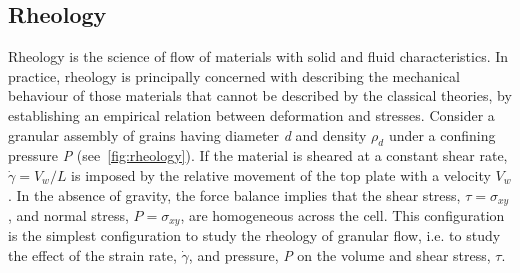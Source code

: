 \subsection{Rheology}
\label{sec:muI}
Rheology is the science of flow of materials with solid and fluid 
characteristics. In practice, rheology is principally concerned with describing 
the mechanical behaviour of those materials that cannot be described by the 
classical theories, by establishing an empirical relation between deformation 
and stresses. Consider a granular assembly of grains having diameter 
\textit{d} and density $\rho_{\textit{d}}$ under a confining pressure 
\textit{P} (see~\cref{fig:rheology}). If the material is sheared at a 
constant shear rate, $\dot{\gamma} = \textit{V}_{\textit{w}} / \textit{L}$ is 
imposed by the relative movement of the top plate with a velocity $ 
\textit{V}_{\textit{w}}$. In the absence of gravity, the force balance implies 
that the shear stress, $\tau= \sigma_{\textit{xy}}$, and normal stress, 
$\textit{P}=\sigma_{\textit{xy}}$, are homogeneous across the cell. This 
configuration is the simplest configuration to study the rheology of granular 
flow, i.e. to study the effect of the strain rate, $\dot{\gamma}$, and 
pressure, \textit{P} on the volume and shear stress, $\tau$. 

